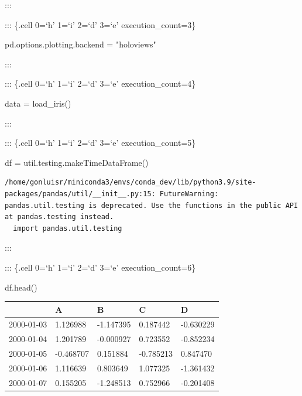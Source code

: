 \documentclass[
  letterpaper,
  DIV=11,
  numbers=noendperiod]{scrreport}
\newenvironment{Shaded}{\begin{snugshade}}{\end{snugshade}}
\newcommand{\NormalTok}[1]{\textcolor[rgb]{0.00,0.23,0.31}{#1}}
\newcommand{\OperatorTok}[1]{\textcolor[rgb]{0.37,0.37,0.37}{#1}}
\newcommand{\StringTok}[1]{\textcolor[rgb]{0.13,0.47,0.30}{#1}}
\begin{document}
:::

::: \{.cell 0=`h' 1=`i' 2=`d' 3=`e' execution\_count=3\}

\begin{Shaded}
\begin{Highlighting}[]
\NormalTok{pd.options.plotting.backend }\OperatorTok{=} \StringTok{"holoviews"}
\end{Highlighting}
\end{Shaded}

:::

::: \{.cell 0=`h' 1=`i' 2=`d' 3=`e' execution\_count=4\}

\begin{Shaded}
\begin{Highlighting}[]
\NormalTok{data }\OperatorTok{=}\NormalTok{ load\_iris()}
\end{Highlighting}
\end{Shaded}

:::

::: \{.cell 0=`h' 1=`i' 2=`d' 3=`e' execution\_count=5\}

\begin{Shaded}
\begin{Highlighting}[]
\NormalTok{df }\OperatorTok{=}\NormalTok{ util.testing.makeTimeDataFrame()}
\end{Highlighting}
\end{Shaded}

\begin{verbatim}
/home/gonluisr/miniconda3/envs/conda_dev/lib/python3.9/site-packages/pandas/util/__init__.py:15: FutureWarning: pandas.util.testing is deprecated. Use the functions in the public API at pandas.testing instead.
  import pandas.util.testing
\end{verbatim}

:::

::: \{.cell 0=`h' 1=`i' 2=`d' 3=`e' execution\_count=6\}

\begin{Shaded}
\begin{Highlighting}[]
\NormalTok{df.head()}
\end{Highlighting}
\end{Shaded}

\begin{longtable}[]{@{}lllll@{}}
\toprule()
& A & B & C & D \\
\midrule()
\endhead
2000-01-03 & 1.126988 & -1.147395 & 0.187442 & -0.630229 \\
2000-01-04 & 1.201789 & -0.000927 & 0.723552 & -0.852234 \\
2000-01-05 & -0.468707 & 0.151884 & -0.785213 & 0.847470 \\
2000-01-06 & 1.116639 & 0.803649 & 1.077325 & -1.361432 \\
2000-01-07 & 0.155205 & -1.248513 & 0.752966 & -0.201408 \\
\bottomrule()
\end{longtable}
\end{document}

